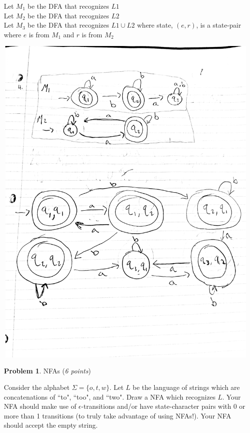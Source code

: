 \documentclass[11pt]{article}
\theoremstyle{definition}
\theoremstyle{theorem}
\newtheorem{prob}{Problem}
\newcommand{\solution}{\medskip\noindent{\color{blue}\textbf{Solution:}}}
\begin{document}
\solution

\noindent Let $M_1$ be the DFA that recognizes $L1$ \\
\noindent Let $M_2$ be the DFA that recognizes $L2$ \\
\noindent Let $M_3$ be the DFA that recognizes $L1 \cup L2$ where state, $(e, r)$, is a state-pair where $e$ is from $M_1$ and $r$ is from $M_2$ 
 
\includegraphics[width=15cm, height=17cm]{./images/prob4.jpg}


\newpage

\begin{prob} NFAs (\emph{6 points})\end{prob}


 Consider the alphabet $\Sigma = \{o, t, w\}$. Let $L$ be the language of strings which are concatenations of ``to", ``too", and ``two".  Draw a NFA which recognizes $L$. Your NFA should make use of $\epsilon$-transitions and/or have state-character pairs with 0 or more than 1 transitions (to truly take advantage of using NFAs!).  Your NFA should accept the empty string.
\end{document}
